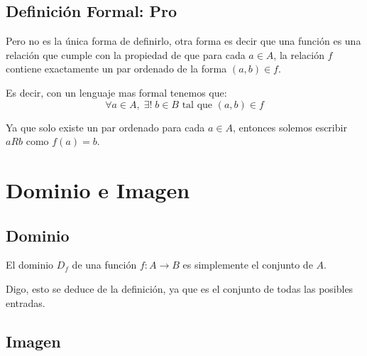 \documentclass[12pt, fleqn]{report}                             %
\theoremstyle{break}                                            %
\begin{document}
            \subsection*{Definición Formal: Pro}

                Pero no es la única forma de definirlo, otra forma es decir que una función es
                una relación que cumple con la propiedad de que para cada $a \in A$, la relación
                $f$ contiene exactamente un par ordenado de la forma $(a,b) \in f$.

                Es decir, con un lenguaje mas formal tenemos que:
                \begin{equation*}
                    \forall a \in A, \; \exists ! \; b \in B \text{ tal que } (a,b) \in f
                \end{equation*}

                Ya que solo existe un par ordenado para cada $a \in A$, entonces solemos escribir 
                $aRb$ como $f(a) = b$.








        \clearpage
        \section{Dominio e Imagen}
            
            \subsection*{Dominio}

                El dominio $D_f$ de una función $f : A \to B$ es simplemente el conjunto de $A$.

                Digo, esto se deduce de la definición, ya que es el conjunto de todas las posibles
                entradas.

            \subsection*{Imagen}
\end{document}
